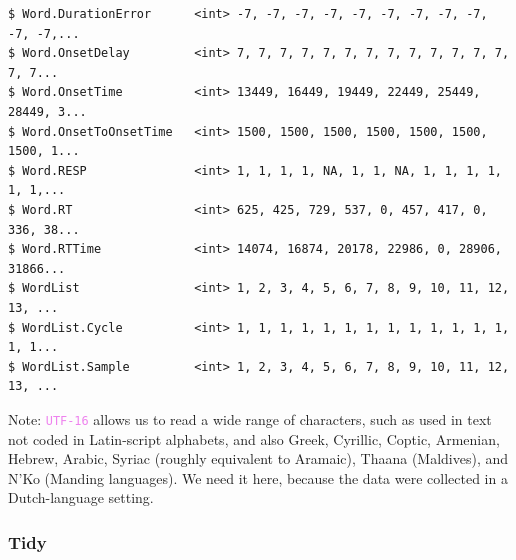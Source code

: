 \documentclass{article}\usepackage[]{graphicx}\usepackage[]{color}
\makeatletter
\newenvironment{kframe}{%
 \def\at@end@of@kframe{}%
 \ifinner\ifhmode%
  \def\at@end@of@kframe{\end{minipage}}%
  \begin{minipage}{\columnwidth}%
 \fi\fi%
 \def\FrameCommand##1{\hskip\@totalleftmargin \hskip-\fboxsep
 \colorbox{shadecolor}{##1}\hskip-\fboxsep
     \hskip-\linewidth \hskip-\@totalleftmargin \hskip\columnwidth}%
 \MakeFramed {\advance\hsize-\width
   \@totalleftmargin\z@ \linewidth\hsize
   \@setminipage}}%
 {\par\unskip\endMakeFramed%
 \at@end@of@kframe}
\newenvironment{knitrout}{}{} %
\newcommand{\code}[1]{\textup{\texttt{\textcolor{violet}{#1}}}}
\makeatother
\begin{document}
\begin{knitrout}
\begin{kframe}
\begin{verbatim}
$ Word.DurationError      <int> -7, -7, -7, -7, -7, -7, -7, -7, -7, -7, -7,...
$ Word.OnsetDelay         <int> 7, 7, 7, 7, 7, 7, 7, 7, 7, 7, 7, 7, 7, 7, 7...
$ Word.OnsetTime          <int> 13449, 16449, 19449, 22449, 25449, 28449, 3...
$ Word.OnsetToOnsetTime   <int> 1500, 1500, 1500, 1500, 1500, 1500, 1500, 1...
$ Word.RESP               <int> 1, 1, 1, 1, NA, 1, 1, NA, 1, 1, 1, 1, 1, 1,...
$ Word.RT                 <int> 625, 425, 729, 537, 0, 457, 417, 0, 336, 38...
$ Word.RTTime             <int> 14074, 16874, 20178, 22986, 0, 28906, 31866...
$ WordList                <int> 1, 2, 3, 4, 5, 6, 7, 8, 9, 10, 11, 12, 13, ...
$ WordList.Cycle          <int> 1, 1, 1, 1, 1, 1, 1, 1, 1, 1, 1, 1, 1, 1, 1...
$ WordList.Sample         <int> 1, 2, 3, 4, 5, 6, 7, 8, 9, 10, 11, 12, 13, ...
\end{verbatim}
\end{kframe}
\end{knitrout}

Note: \code{UTF-16} allows us to read a wide range of characters, such as used in text not coded in Latin-script alphabets, and also Greek, Cyrillic, Coptic, Armenian, Hebrew, Arabic, Syriac (roughly equivalent to Aramaic), Thaana (Maldives), and N'Ko (Manding languages). We need it here, because the data were collected in a Dutch-language setting.

\subsubsection{Tidy}
\end{document}
